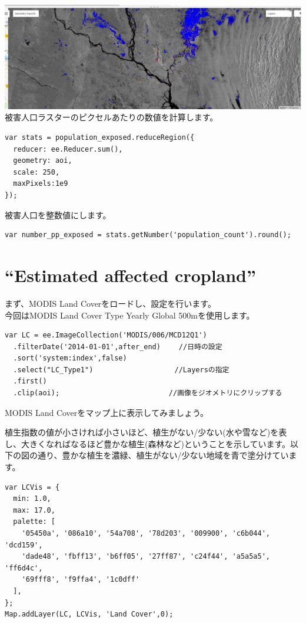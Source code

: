 \documentclass[
]{book}
\begin{document}
\includegraphics{images/exposedp.png}
被害人口ラスターのピクセルあたりの数値を計算します。

\begin{verbatim}
var stats = population_exposed.reduceRegion({
  reducer: ee.Reducer.sum(),
  geometry: aoi,
  scale: 250,
  maxPixels:1e9 
});
\end{verbatim}

被害人口を整数値にします。

\begin{verbatim}
var number_pp_exposed = stats.getNumber('population_count').round();
\end{verbatim}

\hypertarget{estimated-affected-cropland}{%
\section{``Estimated affected cropland''}\label{estimated-affected-cropland}}

まず、MODIS Land Coverをロードし、設定を行います。\\
今回はMODIS Land Cover Type Yearly Global 500mを使用します。

\begin{verbatim}
var LC = ee.ImageCollection('MODIS/006/MCD12Q1')
  .filterDate('2014-01-01',after_end) 　　//日時の設定
  .sort('system:index',false)　　　　　 　
  .select("LC_Type1")　　　　           　//Layersの指定
  .first()                                
  .clip(aoi);　　　　　　　　           　//画像をジオメトリにクリップする
\end{verbatim}

MODIS Land Coverをマップ上に表示してみましょう。

植生指数の値が小さければ小さいほど、植生がない/少ない(水や雪など)を表し、大きくなればなるほど豊かな植生(森林など)ということを示しています。以下の図の通り、豊かな植生を濃緑、植生がない/少ない地域を青で塗分けています。

\begin{verbatim}
var LCVis = {
  min: 1.0,
  max: 17.0,
  palette: [
    '05450a', '086a10', '54a708', '78d203', '009900', 'c6b044', 'dcd159',
    'dade48', 'fbff13', 'b6ff05', '27ff87', 'c24f44', 'a5a5a5', 'ff6d4c',
    '69fff8', 'f9ffa4', '1c0dff'
  ],
};
Map.addLayer(LC, LCVis, 'Land Cover',0);
\end{verbatim}
\end{document}
